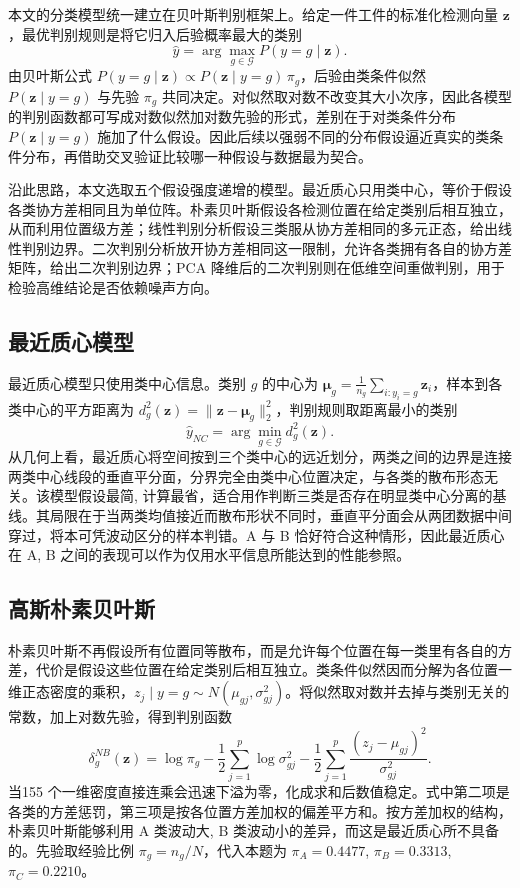 \documentclass[12pt,a4paper]{article}
\begin{document}
本文的分类模型统一建立在贝叶斯判别框架上。给定一件工件的标准化检测向量 $\mathbf{z}$，最优判别规则是将它归入后验概率最大的类别
\begin{equation}
\hat{y}=\arg\max_{g\in\mathcal{G}}P(y=g\mid\mathbf{z}).
\end{equation}
由贝叶斯公式 $P(y=g\mid\mathbf{z})\propto P(\mathbf{z}\mid y=g)\,\pi_g$，后验由类条件似然 $P(\mathbf{z}\mid y=g)$ 与先验 $\pi_g$ 共同决定。对似然取对数不改变其大小次序，因此各模型的判别函数都可写成对数似然加对数先验的形式，差别在于对类条件分布 $P(\mathbf{z}\mid y=g)$ 施加了什么假设。因此后续以强弱不同的分布假设逼近真实的类条件分布，再借助交叉验证比较哪一种假设与数据最为契合。

沿此思路，本文选取五个假设强度递增的模型。最近质心只用类中心，等价于假设各类协方差相同且为单位阵。朴素贝叶斯假设各检测位置在给定类别后相互独立，从而利用位置级方差；线性判别分析假设三类服从协方差相同的多元正态，给出线性判别边界。二次判别分析放开协方差相同这一限制，允许各类拥有各自的协方差矩阵，给出二次判别边界；PCA 降维后的二次判别则在低维空间重做判别，用于检验高维结论是否依赖噪声方向。

\subsection{最近质心模型}

最近质心模型只使用类中心信息。类别 $g$ 的中心为 $\boldsymbol{\mu}_g=\frac{1}{n_g}\sum_{i:y_i=g}\mathbf{z}_i$，样本到各类中心的平方距离为 $d_g^2(\mathbf{z})=\|\mathbf{z}-\boldsymbol{\mu}_g\|_2^2$，判别规则取距离最小的类别
\begin{equation}
\hat{y}_{NC}=\arg\min_{g\in\mathcal{G}}d_g^2(\mathbf{z}).
\end{equation}
从几何上看，最近质心将空间按到三个类中心的远近划分，两类之间的边界是连接两类中心线段的垂直平分面，分界完全由类中心位置决定，与各类的散布形态无关。该模型假设最简, 计算最省，适合用作判断三类是否存在明显类中心分离的基线。其局限在于当两类均值接近而散布形状不同时，垂直平分面会从两团数据中间穿过，将本可凭波动区分的样本判错。A 与 B 恰好符合这种情形，因此最近质心在 A, B 之间的表现可以作为仅用水平信息所能达到的性能参照。

\subsection{高斯朴素贝叶斯}

朴素贝叶斯不再假设所有位置同等散布，而是允许每个位置在每一类里有各自的方差，代价是假设这些位置在给定类别后相互独立。类条件似然因而分解为各位置一维正态密度的乘积，$z_j\mid y=g\sim N(\mu_{gj},\sigma_{gj}^2)$。将似然取对数并去掉与类别无关的常数，加上对数先验，得到判别函数
\begin{equation}
\delta_g^{NB}(\mathbf{z})=\log\pi_g-\frac{1}{2}\sum_{j=1}^{p}\log\sigma_{gj}^2
-\frac{1}{2}\sum_{j=1}^{p}\frac{(z_j-\mu_{gj})^2}{\sigma_{gj}^2}.
\end{equation}
当155 个一维密度直接连乘会迅速下溢为零，化成求和后数值稳定。式中第二项是各类的方差惩罚，第三项是按各位置方差加权的偏差平方和。按方差加权的结构，朴素贝叶斯能够利用 A 类波动大, B 类波动小的差异，而这是最近质心所不具备的。先验取经验比例 $\pi_g=n_g/N$，代入本题为 $\pi_A=0.4477$, $\pi_B=0.3313$, $\pi_C=0.2210$。
\end{document}
